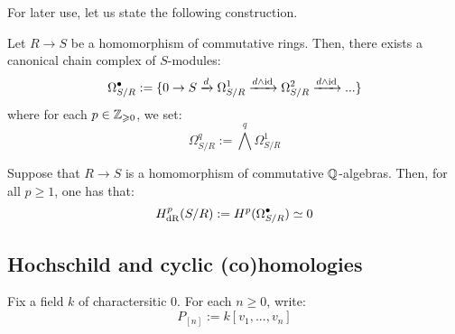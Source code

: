         For later use, let us state the following construction.
        \begin{proposition} \label{prop: algebraic_de_rham_complexes}
            Let $R \to S$ be a homomorphism of commutative rings. Then, there exists a canonical chain complex of $S$-modules:
                $$\Omega_{S/R}^{\bullet} := \{0 \to S \xrightarrow[]{d} \Omega^1_{S/R} \xrightarrow[]{d \wedge \mathrm{id}} \Omega^2_{S/R} \xrightarrow[]{d \wedge \mathrm{id}} ... \}$$
            where for each $p \in \mathbb{Z}_{\geqslant 0}$, we set:
                $$\Omega^q_{S/R} := \bigwedge^q \Omega^1_{S/R}$$
        \end{proposition}
        \begin{lemma}
            Suppose that $R \to S$ is a homomorphism of commutative $\mathbb{Q}$-algebras. Then, for all $p \geq 1$, one has that:
                $$H^p_{\mathrm{dR}}(S/R) := H^p(\Omega^{\bullet}_{S/R}) \simeq 0$$
        \end{lemma}

    \subsection{Hochschild and cyclic (co)homologies}
        \begin{convention}
            Fix a field $k$ of charactersitic $0$. For each $n \geq 0$, write:
                $$P_{[n]} := k[v_1, ..., v_n]$$
        \end{convention}
        
